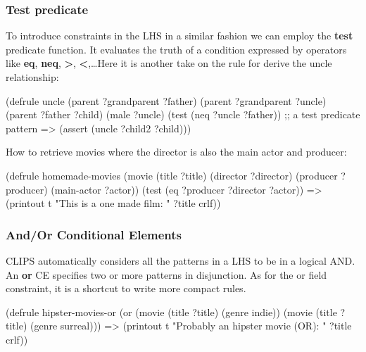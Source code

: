\documentclass[xcolor={usenames,dvipsnames,svgnames}, compress]{beamer}
\begin{document}
\begin{frame}[fragile]
  \frametitle{Test predicate}
  To introduce constraints in the LHS in a similar fashion we can employ the \textbf{test} predicate function. It
  evaluates the truth of a condition expressed by operators like \textbf{eq}, \textbf{neq}, \textbf{>},
  \textbf{<},\dots  Here it is another take on the rule for derive the uncle
  relationship:
  \begin{clips-code}[numbers=none]
    (defrule uncle
        (parent ?grandparent ?father) (parent ?grandparent ?uncle)
        (parent ?father ?child) (male ?uncle)
        (test (neq ?uncle ?father)) ;; a test predicate pattern
        =>
        (assert (uncle ?child2 ?child)))
  \end{clips-code}

  How to retrieve movies where the director is also the main actor and producer:
  \begin{clips-code}[numbers=none]
    (defrule homemade-movies
        (movie (title ?title) 
        (director ?director) (producer ?producer) (main-actor ?actor))
        (test (eq ?producer ?director ?actor))
        =>
        (printout t "This is a one made film: " ?title crlf))
  \end{clips-code}
\end{frame}

\begin{frame}[fragile]
  \frametitle{And/Or Conditional Elements}
  CLIPS automatically considers all the patterns in a LHS to be in a
  logical AND. An \textbf{or} CE specifies two or more patterns in
  disjunction. As for the or field constraint, it is a shortcut to
  write more compact rules.
  \begin{clips-code}[numbers=none]
    (defrule hipster-movies-or
        (or (movie (title ?title) (genre indie))
            (movie (title ?title) (genre surreal)))
        =>
        (printout t "Probably an hipster movie (OR): " ?title crlf))
  \end{clips-code}
\end{frame}
\end{document}
